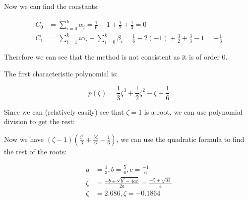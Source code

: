 \documentclass{report}
\begin{document}
\begin{enumerate}
\begin{enumerate}
\begin{enumerate}
      Now we can find the constants:

      \[
      \begin{split}
        C_0 &= \sum\limits^k_{i=0}\alpha_i = \frac{1}{6} - 1 +
        \frac{1}{2} + \frac{1}{3} = 0\\
        C_1 &= \sum\limits^k_{i=1}i\alpha_i -
        \sum\limits^k_{i=0}\beta_i = \frac{1}{6} - 2(-1) + \frac{3}{2}
        + \frac{3}{3} - 1 = -\frac{1}{3}
      \end{split}
      \]

      Therefore we can see that the method is not consistent as it is
      of order $0$.

      The first characteristic polynomial is:

      \[
        p(\zeta) = \frac{1}{3}\zeta^3 + \frac{1}{2}\zeta^2 - \zeta + \frac{1}{6}
      \]

      Since we can (relatively easily) see that $\zeta = 1$ is a root,
      we can use polynomial division to get the rest:

      \begin{center}
      \end{center}
      
      Now we have $(\zeta - 1)\left(\frac{\zeta^2}{3} + \frac{5\zeta}{6} -
      \frac{1}{6}\right)$, we can use the quadratic formula to find the rest
      of the roots:

      \[
      \begin{split}
        a &= \frac{1}{3}, b = \frac{5}{6}, c = \frac{-1}{6}\\
        \zeta &= \frac{-b \pm\sqrt{b^2 - 4ac}}{2a} = \frac{-5 \pm
          \sqrt{33}}{4}\\
        \zeta &= 2.686, \zeta = -0.1864
      \end{split}
      \]


\end{enumerate}
\end{enumerate}
\end{enumerate}
\end{document}
